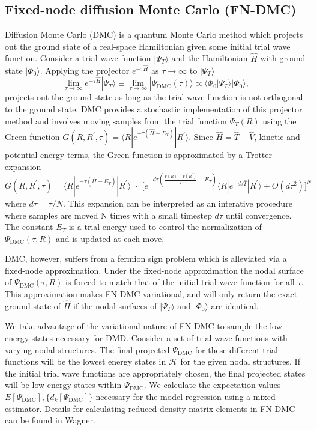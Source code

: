 \documentclass[12pt]{article}
\begin{document}
\subsection{Fixed-node diffusion Monte Carlo (FN-DMC)}
Diffusion Monte Carlo (DMC) is a quantum Monte Carlo method which projects out the ground state of a real-space Hamiltonian given some initial trial wave function.
Consider a trial wave function $|\Psi_T\rangle$ and the Hamiltonian $\hat{H}$ with ground state $|\Phi_0\rangle$. 
Applying the projector $e^{-\tau \hat{H}}$ as $\tau \rightarrow \infty$ to $|\Psi_T \rangle$
\begin{equation}
\lim_{\tau \rightarrow \infty} e^{-\tau \hat{H}} |\Psi_T\rangle 
\equiv \lim_{\tau \rightarrow \infty} |\Psi_\text{DMC}(\tau)\rangle \propto \langle \Phi_0|\Psi_T\rangle |\Phi_0\rangle,
\end{equation}
projects out the ground state as long as the trial wave function is not orthogonal to the ground state. 
DMC provides a stochastic implementation of this projector method and involves moving samples from the trial function $\Psi_T(R)$ using the Green function $G(R, R^\prime, \tau) = \langle R | e^{-\tau(\hat{H} - E_T)} | R^\prime \rangle$. 
Since $\hat{H} = \hat{T} + \hat{V}$, kinetic and potential energy terms, the Green function is approximated by a Trotter expansion 
$$G(R, R^\prime, \tau) = \langle R | e^{-\tau(\hat{H} - E_T)} | R^\prime \rangle \sim \Big[e^{-d\tau(\frac{V(R) + V(R^\prime)}{2} - E_T)} \langle R| e^{-d\tau\hat{T}}|R^\prime \rangle + O(d\tau^2) \Big]^N $$ 
where $d\tau = \tau/N$.
This expansion can be interpreted as an interative procedure where samples are moved N times with a small timestep $d\tau$ until convergence.
The constant $E_T$ is a trial energy used to control the normalization of $\Psi_\text{DMC}(\tau, R)$ and is updated at each move.

DMC, however, suffers from a fermion sign problem which is alleviated via a fixed-node approximation.
Under the fixed-node approximation the nodal surface of $\Psi_\text{DMC}(\tau, R)$ is forced to match that of the initial trial wave function for all $\tau$.
This approximation makes FN-DMC variational, and will only return the exact ground state of $\hat{H}$ if the nodal surfaces of $|\Psi_T\rangle$ and $|\Phi_0\rangle$ are identical.

We take advantage of the variational nature of FN-DMC to sample the low-energy states necessary for DMD.
Consider a set of trial wave functions with varying nodal structures.
The final projected $\Psi_\text{DMC}$ for these different trial functions will be the lowest energy states in $\mathcal{H}$ for the given nodal structures.
If the initial trial wave functions are appropriately chosen, the final projected states will be low-energy states within $\Psi_\text{DMC}$.
We calculate the expectation values $E[\Psi_\text{DMC}], \{d_k[\Psi_\text{DMC}]\}$ necessary for the model regression using a mixed estimator.
Details for calculating reduced density matrix elements in FN-DMC can be found in Wagner.
\end{document}
